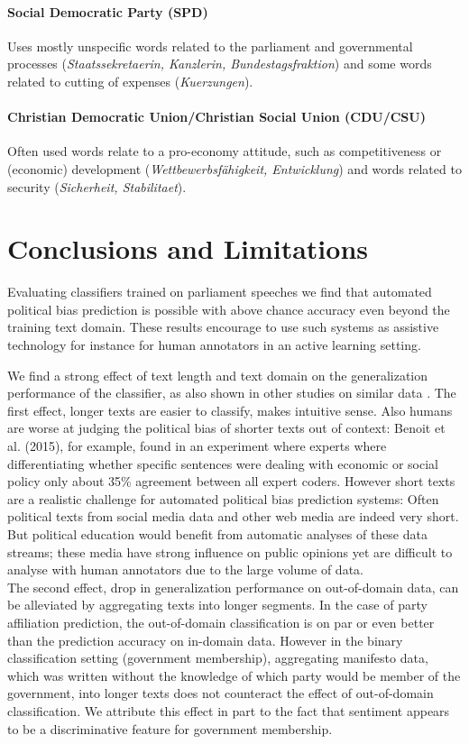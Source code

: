 \documentclass[11pt]{article}
\begin{document}
\paragraph{\bf Social Democratic Party (SPD)} Uses mostly unspecific words related to the parliament and governmental processes ({\em Staatssekretaerin, Kanzlerin, Bundestagsfraktion}) and some words related to cutting of expenses ({\em Kuerzungen}).
\paragraph{\bf Christian Democratic Union/Christian Social Union (CDU/CSU)}
Often used words relate to a pro-economy attitude, such as competitiveness or (economic) development ({\em Wettbewerbsf\"ahigkeit, Entwicklung}) and words related to security ({\em Sicherheit, Stabilitaet}). 

\section{Conclusions and Limitations}\label{sec:conclusion}
Evaluating classifiers trained on parliament speeches we find that automated political bias prediction is possible with above chance accuracy even beyond the training text domain. These results encourage to use such systems as assistive technology for instance for human annotators in an active learning setting. 

We find a strong effect of text length and text domain on the generalization performance of the classifier, as also shown in other studies on similar data \cite{Yu2008, Hirst2014}. The first effect, longer texts are easier to classify, makes intuitive sense. Also humans are worse at judging the political bias of shorter texts out of context: Benoit et al. (2015), for example, found in an experiment where experts where differentiating whether specific sentences were dealing with economic or social policy only about 35\% agreement between all expert coders. However short texts are a realistic challenge for automated political bias prediction systems: Often political texts from social media data and other web media are indeed very short. But political education would benefit from automatic analyses of these data streams; these media have strong influence on public opinions yet are difficult to analyse with human annotators due to the large volume of data. \\
The second effect, drop in generalization performance on out-of-domain data, can be alleviated by aggregating texts into longer segments. In the case of party affiliation prediction, the out-of-domain classification is on par or even better than the prediction accuracy on in-domain data. However in the binary classification setting (government membership), aggregating manifesto data, which was written without the knowledge of which party would be member of the government, into longer texts does not counteract the effect of out-of-domain classification. We attribute this effect in part to the fact that sentiment appears to be a discriminative feature for government membership. 
\end{document}
